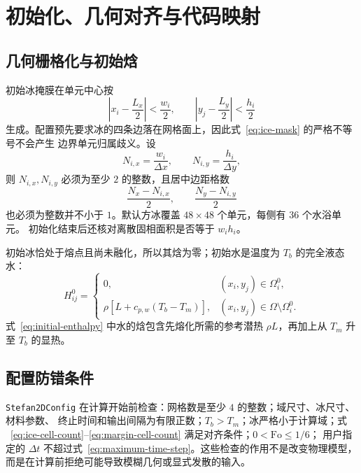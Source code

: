 \documentclass[UTF8,11pt]{ctexart}
\numberwithin{equation}{section}
\newcommand{\code}[1]{\texttt{#1}}
\begin{document}
\section{初始化、几何对齐与代码映射}

\subsection{几何栅格化与初始焓}

初始冰掩膜在单元中心按
\begin{equation}
      \left|x_i-\frac{L_x}{2}\right|<\frac{w_i}{2},
      \qquad
      \left|y_j-\frac{L_y}{2}\right|<\frac{h_i}{2}
      \label{eq:ice-mask}
\end{equation}
生成。配置预先要求冰的四条边落在网格面上，因此式~\eqref{eq:ice-mask} 的严格不等号不会产生
边界单元归属歧义。设
\begin{equation}
      N_{i,x}=\frac{w_i}{\Delta x},\qquad
      N_{i,y}=\frac{h_i}{\Delta y},
      \label{eq:ice-cell-count}
\end{equation}
则 $N_{i,x},N_{i,y}$ 必须为至少 $2$ 的整数，且居中边距格数
\begin{equation}
      \frac{N_x-N_{i,x}}{2},\qquad
      \frac{N_y-N_{i,y}}{2}
      \label{eq:margin-cell-count}
\end{equation}
也必须为整数并不小于 $1$。默认方冰覆盖 $48\times48$ 个单元，每侧有 $36$ 个水浴单元。
初始化结束后还核对离散固相面积是否等于 $w_i h_i$。

初始冰恰处于熔点且尚未融化，所以其焓为零；初始水是温度为 $T_b$ 的完全液态水：
\begin{equation}
      H_{ij}^{0}=
      \begin{cases}
            0,
            & (x_i,y_j)\in\Omega_i^0,\\[1mm]
            \rho\left[L+c_{p,w}(T_b-T_m)\right],
            & (x_i,y_j)\in\Omega\setminus\Omega_i^0.
      \end{cases}
      \label{eq:initial-enthalpy}
\end{equation}
式~\eqref{eq:initial-enthalpy} 中水的焓包含先熔化所需的参考潜热 $\rho L$，再加上从 $T_m$
升至 $T_b$ 的显热。

\subsection{配置防错条件}

\code{Stefan2DConfig} 在计算开始前检查：网格数是至少 $4$ 的整数；域尺寸、冰尺寸、材料参数、
终止时间和输出间隔为有限正数；$T_b>T_m$；冰严格小于计算域；式
~\eqref{eq:ice-cell-count}--\eqref{eq:margin-cell-count} 满足对齐条件；$0<\mathrm{Fo}\le1/6$；
用户指定的 $\Delta t$ 不超过式~\eqref{eq:maximum-time-step}。这些检查的作用不是改变物理模型，
而是在计算前拒绝可能导致模糊几何或显式发散的输入。
\end{document}
